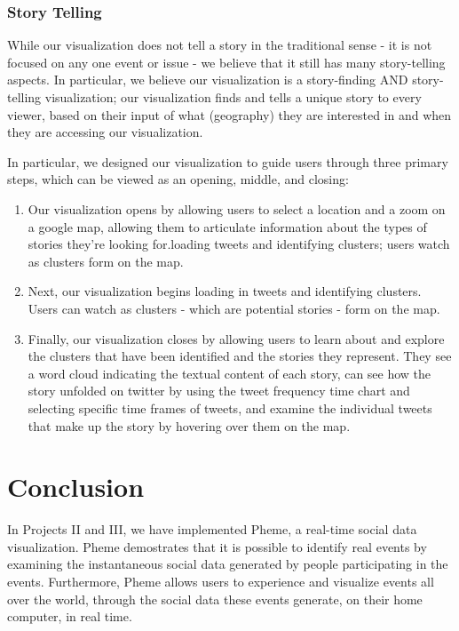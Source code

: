 \documentclass[pdftex,12pt,a4paper]{article}
\begin{document}
\subsubsection{Story Telling}
While our visualization does not tell a story in the traditional sense - it is not focused on any one event or issue - we believe that it still has many story-telling aspects. In particular, we believe our visualization is a story-finding AND story-telling visualization; our visualization finds and tells a unique story to every viewer, based on their input of what (geography) they are interested in and when they are accessing our visualization.

In particular, we designed our visualization to guide users through three primary steps, which can be viewed as an opening, middle, and closing:
\begin{enumerate}
\item Our visualization opens by allowing users to select a location and a zoom on a google map, allowing them to articulate information about the types of stories they're looking for.loading tweets and identifying clusters; users watch as clusters form on the map. 
\item Next, our visualization begins loading in tweets and identifying clusters. Users can watch as clusters - which are potential stories - form on the map. 
\item Finally, our visualization closes by allowing users to learn about and explore the clusters that have been identified and the stories they represent. They see a word cloud indicating the textual content of each story, can see how the story unfolded on twitter by using the tweet frequency time chart and selecting specific time frames of tweets, and examine the individual tweets that make up the story by hovering over them on the map.
\end{enumerate}  


\section{Conclusion}
In Projects II and III, we have implemented Pheme, a real-time social data visualization. Pheme demostrates that it is possible to identify real events by examining the instantaneous social data generated by people participating in the events. Furthermore, Pheme allows users to experience and visualize events all over the world, through the social data these events generate, on their home computer, in real time.
\end{document}

